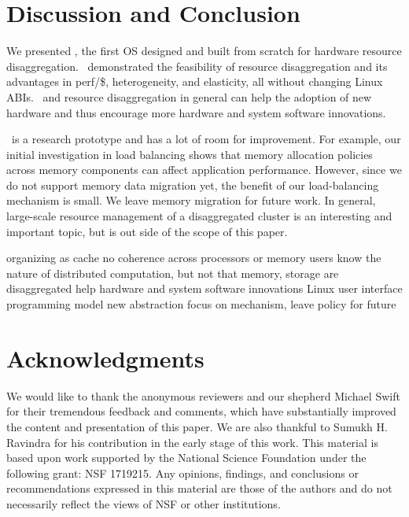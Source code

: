 \documentclass[10pt,times,twocolumn]{z2-article}
\begin{document}
{{{{{{{\section{Discussion and Conclusion}
\label{sec:conclude}

We presented \lego, the first OS designed and built from scratch for hardware resource disaggregation.
\lego\ demonstrated the feasibility of resource disaggregation and its advantages in perf/\$,
heterogeneity, and elasticity, all without changing Linux ABIs.
\lego\ and resource disaggregation in general can help the adoption of new hardware
and thus encourage more hardware and system software innovations.  

\lego\ is a research prototype and has a lot of room for improvement.
For example, our initial investigation in load balancing 
shows that memory allocation policies across memory components can affect application performance.
However, since we do not support memory data migration yet, 
the benefit of our load-balancing mechanism is small.
We leave memory migration for future work.
In general, large-scale resource management of a disaggregated cluster is 
an interesting and important topic, but is out side of the scope of this paper.

organizing as cache
no coherence across processors or memory
users know the nature of distributed computation, but not that memory, storage are disaggregated
help hardware and system software innovations
Linux
user interface programming model
new abstraction
focus on mechanism, leave policy for future
\fi
\section*{Acknowledgments}

We would like to thank the anonymous reviewers and our shepherd Michael Swift
for their tremendous feedback and comments, which have
substantially improved the content and presentation of this paper.
We are also thankful to Sumukh H. Ravindra for his contribution in the early
stage of this work.
This material is based upon work supported by the National
Science Foundation under the following grant: NSF 1719215.
Any opinions, findings, and conclusions or recommendations
expressed in this material are those of the authors and do not 
necessarily reflect the views of NSF or other institutions.

%






}}}}}}}
\end{document}

